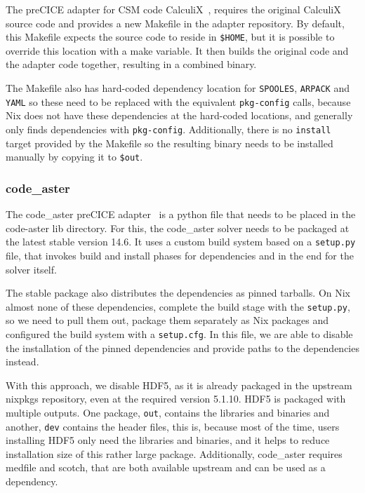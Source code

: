 \documentclass{eceasst}
\begin{document}
The preCICE adapter for CSM code CalculiX~\cite{Uekermann2017_Adapters}, requires the original CalculiX source code and provides a new Makefile in the adapter repository.
By default, this Makefile expects the source code to reside in \texttt{\$HOME}, but it is possible to override this location with a make variable.
It then builds the original code and the adapter code together, resulting in a combined binary.

The Makefile also has hard-coded dependency location for \texttt{SPOOLES}, \texttt{ARPACK} and \texttt{YAML} so these need to be replaced with the equivalent \texttt{pkg-config} calls, because Nix does not have these dependencies at the hard-coded locations, and generally only finds dependencies with \texttt{pkg-config}.
Additionally, there is no \texttt{install} target provided by the Makefile so the resulting binary needs to be installed manually by copying it to \texttt{\$out}.\\

\subsubsection{code\_aster}

The code\_aster preCICE adapter~\cite{Uekermann2017_Adapters} is a python file that needs to be placed in the code-aster lib directory.
For this, the code\_aster solver needs to be packaged at the latest stable version 14.6.
It uses a custom build system based on a \texttt{setup.py} file, that invokes build and install phases for dependencies and in the end for the solver itself.

The stable package also distributes the dependencies as pinned tarballs.
On Nix almost none of these dependencies, complete the build stage with the \texttt{setup.py}, so we need to pull them out, package them separately as Nix packages and configured the build system with a \texttt{setup.cfg}.
In this file, we are able to disable the installation of the pinned dependencies and provide paths to the dependencies instead.

With this approach, we disable HDF5, as it is already packaged in the upstream nixpkgs repository, even at the required version 5.1.10.
HDF5 is packaged with multiple outputs.
One package, \texttt{out}, contains the libraries and binaries and another, \texttt{dev} contains the header files, this is, because most of the time, users installing HDF5 only need the libraries and binaries, and it helps to reduce installation size of this rather large package.
Additionally, code\_aster requires medfile and scotch, that are both available upstream and can be used as a dependency.
\end{document}
